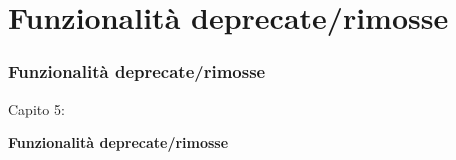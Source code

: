 %

\section{Funzionalità deprecate/rimosse}
\begin{frame}[fragile]
	\frametitle{Funzionalità deprecate/rimosse}

	\begin{center}\huge{Capito 5:}\end{center}
	\begin{center}\huge{\color{typo3darkgrey}\textbf{Funzionalità deprecate/rimosse}}\end{center}

\end{frame}


